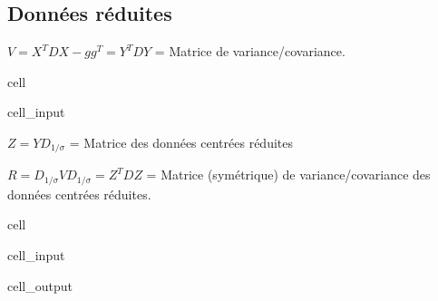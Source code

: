 \documentclass[letterpaper,10pt,french]{sphinxmanual}
\begin{document}
\subsection{Données réduites}
\label{\detokenize{acp:id2}}
\sphinxAtStartPar
\(V=X^TDX-gg^T=Y^TDY\) = Matrice de variance/covariance.

\begin{sphinxuseclass}{cell}
\begin{sphinxuseclass}{cell_input}
\begin{sphinxVerbatim}[commandchars=\\\{\}]
  
      
\end{sphinxVerbatim}

\end{sphinxuseclass}
\end{sphinxuseclass}
\sphinxAtStartPar
\(Z = Y D_{1/\sigma}\) = Matrice des données centrées réduites

\sphinxAtStartPar
\(R = D_{1/\sigma}VD_{1/\sigma} = Z^T  D  Z\) = Matrice (symétrique) de variance/covariance des données centrées réduites.

\begin{sphinxuseclass}{cell}
\begin{sphinxuseclass}{cell_input}
\begin{sphinxVerbatim}[commandchars=\\\{\}]
    \PYG{p}{[}    \PYG{p}{]}
  \PYG{p}{[}    \PYG{p}{]}
    
    
     
\end{sphinxVerbatim}

\end{sphinxuseclass}
\begin{sphinxuseclass}{cell_output}
\noindent{}

\end{sphinxuseclass}
\end{sphinxuseclass}
\end{document}
